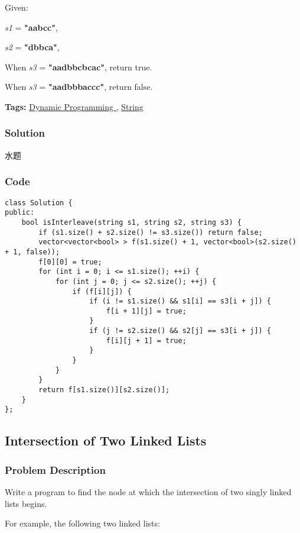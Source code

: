 \documentclass{article}
\begin{document}
\begin{CJK*}{UTF8}{gkai}
Given:


\emph{s1} = \textbf{"aabcc"},


\emph{s2} = \textbf{"dbbca"},

When \emph{s3} = \textbf{"aadbbcbcac"}, return true.


When \emph{s3} = \textbf{"aadbbbaccc"}, return false.


\textbf{Tags: }
\hyperref[ Dynamic Programming ]{ Dynamic Programming },  \hyperref[ String ]{ String }



\subsubsection*{Solution}
水题

\subsubsection*{Code}
\begin{lstlisting}
class Solution {
public:
    bool isInterleave(string s1, string s2, string s3) {
        if (s1.size() + s2.size() != s3.size()) return false;
        vector<vector<bool> > f(s1.size() + 1, vector<bool>(s2.size() + 1, false));
        f[0][0] = true;
        for (int i = 0; i <= s1.size(); ++i) {
            for (int j = 0; j <= s2.size(); ++j) {
                if (f[i][j]) {
                    if (i != s1.size() && s1[i] == s3[i + j]) {
                        f[i + 1][j] = true;
                    }
                    if (j != s2.size() && s2[j] == s3[i + j]) {
                        f[i][j + 1] = true;
                    }
                }
            }
        }
        return f[s1.size()][s2.size()];
    }
}; 
\end{lstlisting}


\subsection{ Intersection of Two Linked Lists }
\label{ Intersection of Two Linked Lists }

\subsubsection*{Problem Description}
Write a program to find the node at which the intersection of two singly linked lists begins.

For example, the following two linked lists:


\end{CJK*}
\end{document}
